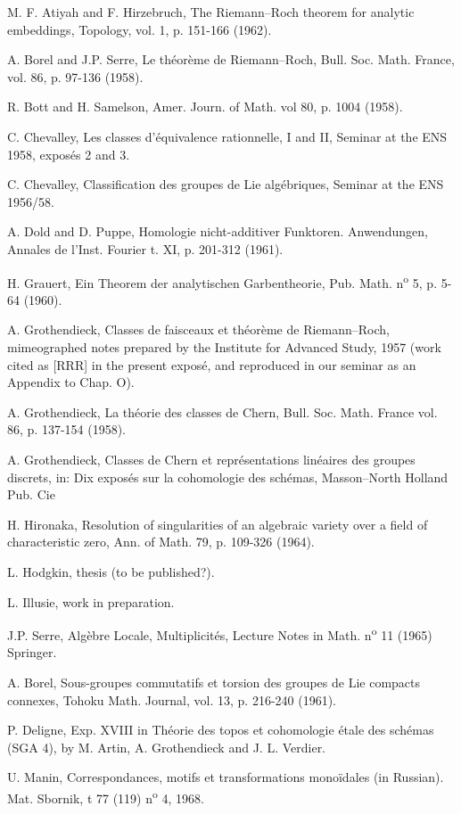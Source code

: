 \begin{enumerate}[label={[\arabic*]}]
\item M. F. Atiyah and F. Hirzebruch, The Riemann--Roch theorem for analytic embeddings, Topology, vol. 1, p. 151-166 (1962).
\item A. Borel and J.P. Serre, Le théorème de Riemann--Roch, Bull. Soc. Math. France, vol. 86, p. 97-136 (1958).
\item R. Bott and H. Samelson, Amer. Journ. of Math. vol 80, p. 1004 (1958).
\item C. Chevalley, Les classes d'équivalence rationnelle, I and II, Seminar at the ENS 1958, exposés 2 and 3.
\item C. Chevalley, Classification des groupes de Lie algébriques, Seminar at the ENS 1956/58.
\item A. Dold and D. Puppe, Homologie nicht-additiver Funktoren. Anwendungen, Annales de l'Inst. Fourier t. XI, p. 201-312 (1961).
\item H. Grauert, Ein Theorem der analytischen Garbentheorie, Pub. Math. n\textsuperscript{o} 5, p. 5-64 (1960).
\item A. Grothendieck, Classes de faisceaux et théorème de Riemann--Roch, mimeographed notes prepared by the Institute for Advanced Study, 1957 (work cited as [RRR] in the present exposé, and reproduced in our seminar as an Appendix to Chap. O).
\item A. Grothendieck, La théorie des classes de Chern, Bull. Soc. Math. France vol. 86, p. 137-154 (1958).
%
\item A.
Grothendieck, Classes de Chern et représentations linéaires des groupes discrets, in: Dix exposés sur la cohomologie des schémas, Masson--North Holland Pub. Cie
\item H. Hironaka, Resolution of singularities of an algebraic variety over a field of characteristic zero, Ann. of Math. 79, p. 109-326 (1964).
\item L. Hodgkin, thesis (to be published?).
\item L. Illusie, work in preparation.
\item J.P. Serre, Algèbre Locale, Multiplicités, Lecture Notes in Math. n\textsuperscript{o} 11 (1965) Springer.
\item A. Borel, Sous-groupes commutatifs et torsion des groupes de Lie compacts connexes, Tohoku Math. Journal, vol. 13, p. 216-240 (1961).
\item[{[16]}(*)] P. Deligne, Exp. XVIII in Théorie des topos et cohomologie étale des schémas (SGA 4), by M. Artin, A. Grothendieck and J. L. Verdier.
\item[{[17]}(*)] U. Manin, Correspondances, motifs et transformations monoïdales (in Russian). Mat. Sbornik, t 77 (119) n\textsuperscript{o} 4, 1968.
\end{enumerate}

